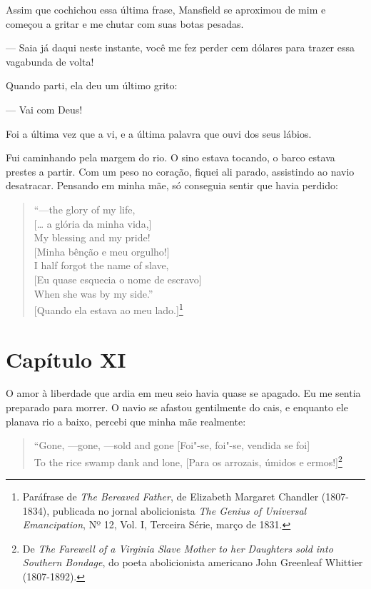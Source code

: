 Assim que cochichou essa última frase, Mansfield se aproximou de mim e
começou a gritar e me chutar com suas botas pesadas.

--- Saia já daqui neste instante, você me fez perder cem dólares para
trazer essa vagabunda de volta!

Quando parti, ela deu um último grito:

--- Vai com Deus!

Foi a última vez que a vi, e a última palavra que ouvi dos seus lábios.

Fui caminhando pela margem do rio. O sino estava tocando, o barco estava
prestes a partir. Com um peso no coração, fiquei ali parado, assistindo
ao navio desatracar. Pensando em minha mãe, só conseguia sentir que
havia perdido:

\begin{verse}
``---the glory of my life,\\
{[}\ldots{} a glória da minha vida,{]}\\
My blessing and my pride!\\
{[}Minha bênção e meu orgulho!{]}\\
I half forgot the name of slave,\\
{[}Eu quase esquecia o nome de escravo{]}\\
When she was by my side.''\\
{[}Quando ela estava ao meu lado.{]}\footnote{Paráfrase de \emph{The Bereaved Father}, de Elizabeth
  Margaret Chandler (1807-1834), publicada no jornal abolicionista
  \emph{The Genius of Universal Emancipation}, Nº 12, Vol. I, Terceira
  Série, março de 1831.}
\end{verse}

\chapter{Capítulo XI}

O amor à liberdade que ardia em meu seio havia quase se apagado. Eu me
sentia preparado para morrer. O navio se afastou gentilmente do cais, e
enquanto ele planava rio a baixo, percebi que minha mãe realmente:

\begin{quote}
``Gone, ---gone, ---sold and gone {[}Foi"-se, foi"-se, vendida se foi{]}\\
To the rice swamp dank and lone, {[}Para os arrozais, úmidos e
ermos!{]}\footnote{De \emph{The Farewell of a Virginia Slave Mother to
  her Daughters sold into Southern Bondage}, do poeta abolicionista
  americano John Greenleaf Whittier (1807-1892).}
\end{quote}

